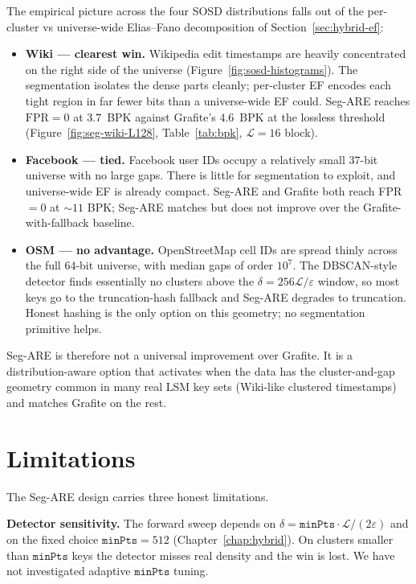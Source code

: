 The empirical picture across the four SOSD distributions falls out of
the per-cluster vs universe-wide Elias--Fano decomposition of
Section~\ref{sec:hybrid-ef}:

\begin{itemize}
    \item \textbf{Wiki --- clearest win.} Wikipedia edit timestamps
    are heavily concentrated on the right side of the universe
    (Figure~\ref{fig:sosd-histograms}). The segmentation isolates the dense parts
    cleanly; per-cluster EF encodes each tight region in far fewer
    bits than a universe-wide EF could.
    Seg-ARE reaches $\mathrm{FPR} = 0$ at $3.7$~BPK against Grafite's
    $4.6$~BPK at the lossless threshold
    (Figure~\ref{fig:seg-wiki-L128}, Table~\ref{tab:bpk}, $\mathcal{L}=16$ block).
    \item \textbf{Facebook --- tied.} Facebook user IDs occupy a
    relatively small $37$-bit universe with no large gaps. There is
    little for segmentation to exploit, and universe-wide EF is
    already compact.
    Seg-ARE and Grafite both reach FPR $= 0$ at $\sim\!11$ BPK;
    Seg-ARE matches but does not improve over the Grafite-with-fallback baseline.
    \item \textbf{OSM --- no advantage.} OpenStreetMap cell IDs are
    spread thinly across the full $64$-bit universe, with median gaps
    of order $10^7$. The DBSCAN-style detector finds essentially no
    clusters above the $\delta = 256\mathcal{L}/\varepsilon$ window,
    so most keys go to the truncation-hash fallback and Seg-ARE
    degrades to truncation. Honest hashing is the only option on this
    geometry; no segmentation primitive helps.
\end{itemize}

Seg-ARE is therefore not a universal improvement over Grafite.
It is a distribution-aware option that activates when the data has the
cluster-and-gap geometry common in many real LSM key sets
(Wiki-like clustered timestamps) and matches Grafite on the rest.

\section{Limitations}
\label{sec:conclusion-limits}

The Seg-ARE design carries three honest limitations.

\textbf{Detector sensitivity.} The forward sweep depends on
$\delta = \texttt{minPts} \cdot \mathcal{L} / (2\varepsilon)$ and on
the fixed choice $\texttt{minPts} = 512$
(Chapter~\ref{chap:hybrid}). On clusters smaller than $\texttt{minPts}$
keys the detector misses real density and the win is lost.
We have not investigated adaptive $\texttt{minPts}$ tuning.

